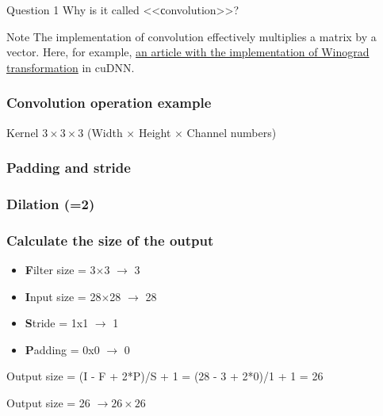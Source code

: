 \documentclass[fullscreen=true, bookmarks=true, hyperref={pdfencoding=unicode}]{beamer}
\begin{document}
\begin{frame}
    \begin{block}{Question 1}
    Why is it called <<сonvolution>>?
    \end{block}
    \pause
    \begin{alertblock}{Note}
    The implementation of convolution effectively multiplies a matrix by a vector. Here, for example, \href{https://arxiv.org/pdf/1509.09308.pdf}{an article with the implementation of Winograd transformation} in cuDNN.
    \end{alertblock}
\end{frame}


\begin{frame}
  \frametitle{Convolution operation example}
   Kernel $3\times3\times3$ (Width $\times$ Height $\times$ Channel numbers)  
  \begin{center}
  \end{center}


\end{frame}


\begin{frame}
  \frametitle{Padding and stride}
  \begin{center}
  \end{center}
\end{frame}

\begin{frame}
  \frametitle{Dilation (=2)}
  \begin{center}
  \end{center}
\end{frame}


\begin{frame}
  \frametitle{Calculate the size of the output}
  \begin{itemize}
    \item {\bf F}ilter size = 3$\times$3 $\to$ 3
    \item {\bf I}nput size = 28$\times$28 $\to$ 28
    \item {\bf S}tride = 1x1 $\to$ 1
    \item {\bf P}adding = 0x0 $\to$ 0
  \end{itemize}

  Output size = (I - F + 2*P)/S + 1 = (28 - 3 + 2*0)/1 + 1 = 26

  Output size = 26 $\to 26\times 26$

\end{frame}
\end{document}
